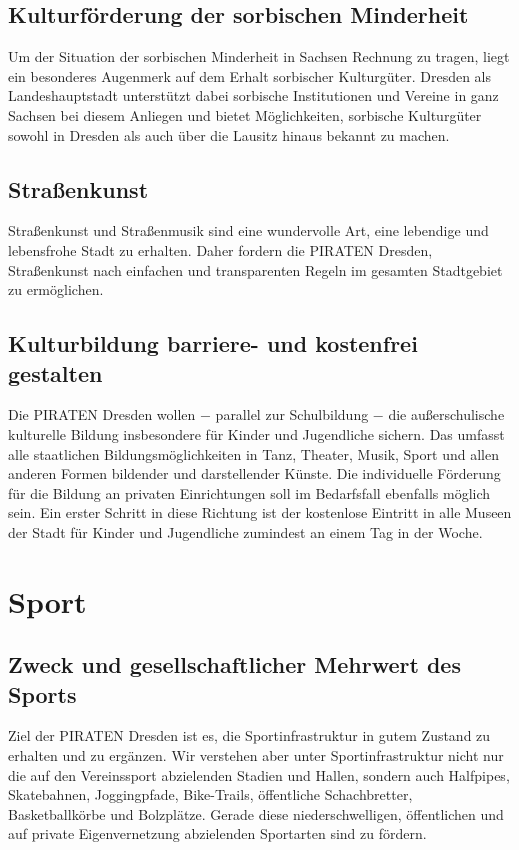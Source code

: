 \documentclass[a4paper, 11pt]{article}
\begin{document}
\subsection{Kulturförderung der sorbischen Minderheit}
Um der Situation der sorbischen Minderheit in Sachsen Rechnung zu tragen, liegt ein besonderes Augenmerk auf dem Erhalt sorbischer Kulturgüter. Dresden als Landeshauptstadt unterstützt dabei sorbische Institutionen und Vereine in ganz Sachsen bei diesem Anliegen und bietet Möglichkeiten, sorbische Kulturgüter sowohl in Dresden als auch über die Lausitz hinaus bekannt zu machen.


\subsection{Straßenkunst}
Straßenkunst und Straßenmusik sind eine wundervolle Art, eine lebendige und lebensfrohe Stadt zu erhalten. Daher fordern die PIRATEN Dresden, Straßenkunst nach einfachen und transparenten Regeln im gesamten Stadtgebiet zu ermöglichen.



\subsection{Kulturbildung barriere- und kostenfrei gestalten}
Die PIRATEN Dresden wollen $-$ parallel zur Schulbildung $-$ die außerschulische kulturelle Bildung insbesondere für Kinder und Jugendliche sichern. Das umfasst alle staatlichen Bildungsmöglichkeiten in Tanz, Theater, Musik, Sport und allen anderen Formen bildender und darstellender Künste. Die individuelle Förderung für die Bildung an privaten Einrichtungen soll im Bedarfsfall ebenfalls möglich sein. Ein erster Schritt in diese Richtung ist der kostenlose Eintritt in alle Museen der Stadt für Kinder und Jugendliche zumindest an einem Tag in der Woche.


\section{Sport}

\subsection{Zweck und gesellschaftlicher Mehrwert des Sports}
Ziel der PIRATEN Dresden ist es, die Sportinfrastruktur in gutem Zustand zu erhalten und zu ergänzen. Wir verstehen aber unter Sportinfrastruktur nicht nur die auf den Vereinssport abzielenden Stadien und Hallen, sondern auch Halfpipes, Skatebahnen, Joggingpfade, Bike-Trails, öffentliche Schachbretter, Basketballkörbe und Bolzplätze. Gerade diese niederschwelligen, öffentlichen und auf private Eigenvernetzung abzielenden Sportarten sind zu fördern.
\end{document}
